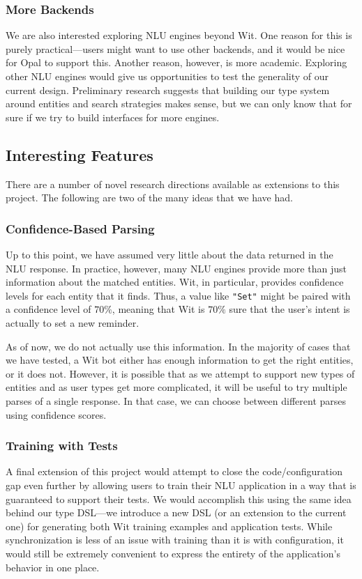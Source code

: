 \documentclass[twocolumn]{article}
\newcommand{\ts}[1]{\texttt{#1}}
\begin{document}
\subsubsection{More Backends}
We are also interested exploring NLU engines beyond Wit. One reason for this is
purely practical---users might want to use other backends, and it would be nice
for Opal to support this. Another reason, however, is more academic. Exploring
other NLU engines would give us opportunities to test the generality of our
current design. Preliminary research suggests that building our type system
around entities and search strategies makes sense, but we can only know that for
sure if we try to build interfaces for more engines.

\subsection{Interesting Features}
There are a number of novel research directions available as extensions to this
project. The following are two of the many ideas that we have had.

\subsubsection{Confidence-Based Parsing}
Up to this point, we have assumed very little about the data returned in the NLU
response. In practice, however, many NLU engines provide more than just
information about the matched entities. Wit, in particular, provides confidence
levels for each entity that it finds. Thus, a value like \ts{"Set"} might be
paired with a confidence level of $70\%$, meaning that Wit is $70\%$ sure that
the user's intent is actually to set a new reminder.

As of now, we do not actually use this information. In the majority of cases
that we have tested, a Wit bot either has enough information to get the right
entities, or it does not. However, it is possible that as we attempt to support
new types of entities and as user types get more complicated, it will be useful
to try multiple parses of a single response. In that case, we can choose between
different parses using confidence scores.

\subsubsection{Training with Tests}
A final extension of this project would attempt to close the code/configuration
gap even further by allowing users to train their NLU application in a way that
is guaranteed to support their tests. We would accomplish this using the same
idea behind our type DSL---we introduce a new DSL (or an extension to the
current one) for generating both Wit training examples and application tests.
While synchronization is less of an issue with training than it is with
configuration, it would still be extremely convenient to express the entirety of
the application's behavior in one place.
\end{document}
